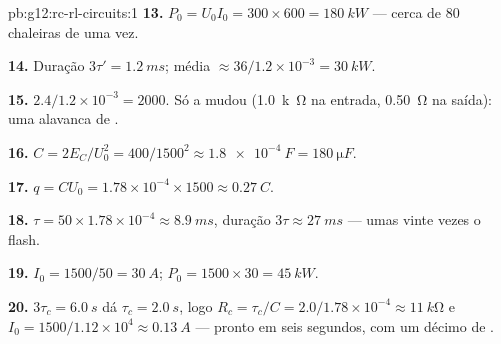\begin{solution}{pb:g12:rc-rl-circuits:1}
\textbf{13.} $P_0 = U_0 I_0 = 300 \times 600 = \qty{180}{kW}$ --- cerca
de $80$ chaleiras de uma vez.

\textbf{14.} Duração $3\tau' = \qty{1.2}{ms}$;  média
$\approx 36/1.2\times10^{-3} = \qty{30}{kW}$.

\textbf{15.} $2.4/1.2\times10^{-3} = 2000$. Só a  mudou
(\qty{1.0}{k\ohm} na entrada, \qty{0.50}{\ohm} na saída): uma alavanca de
.

\textbf{16.} $C = 2E_C/U_0^2 = 400/1500^2 \approx \qty{1.8e-4}{F} =
\qty{180}{\micro F}$.

\textbf{17.} $q = CU_0 = 1.78\times10^{-4} \times 1500 \approx
\qty{0.27}{C}$.

\textbf{18.} $\tau = 50 \times 1.78\times10^{-4} \approx \qty{8.9}{ms}$,
duração $3\tau \approx \qty{27}{ms}$ --- umas vinte vezes o flash.

\textbf{19.} $I_0 = 1500/50 = \qty{30}{A}$;
$P_0 = 1500 \times 30 = \qty{45}{kW}$.

\textbf{20.} $3\tau_c = \qty{6.0}{s}$ dá $\tau_c = \qty{2.0}{s}$, logo
$R_c = \tau_c/C = 2.0/1.78\times10^{-4} \approx \qty{11}{k\ohm}$ e
$I_0 = 1500/1.12\times10^{4} \approx \qty{0.13}{A}$ --- pronto em seis
segundos, com um décimo de .
\end{solution}
